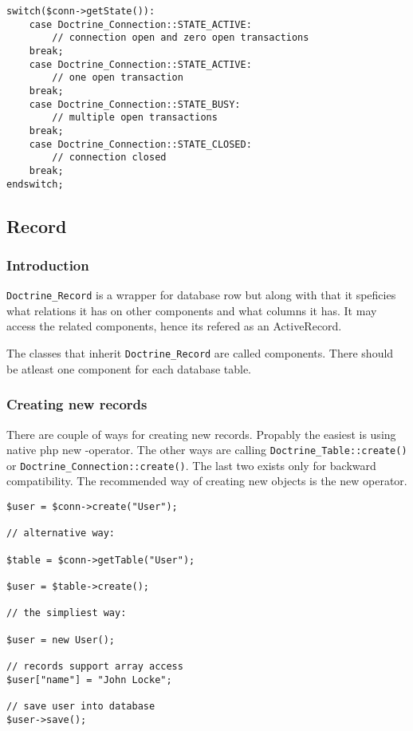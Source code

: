 \documentclass[11pt,a4paper]{report}
\begin{document}
\begin{verbatim}
switch($conn->getState()):
    case Doctrine_Connection::STATE_ACTIVE:
        // connection open and zero open transactions
    break;
    case Doctrine_Connection::STATE_ACTIVE:
        // one open transaction
    break;
    case Doctrine_Connection::STATE_BUSY:
        // multiple open transactions
    break;
    case Doctrine_Connection::STATE_CLOSED:
        // connection closed
    break;
endswitch;
\end{verbatim}

\subsection{Record}
\subsubsection{Introduction}
\texttt{Doctrine\_Record} is a wrapper for database row but along with that it speficies what relations it has\newline
on other components and what columns it has. It may access the related components, hence its refered as an ActiveRecord.

The classes that inherit \texttt{Doctrine\_Record} are called components. There should be atleast one component for each database table.

\subsubsection{Creating new records}
There are couple of ways for creating new records. Propably the easiest is using native php new -operator. The other ways are calling \texttt{Doctrine\_Table::create()} or \texttt{Doctrine\_Connection::create()}. The last two exists only for backward compatibility. The recommended way of creating new objects is the new operator.

\begin{verbatim}
$user = $conn->create("User");

// alternative way:

$table = $conn->getTable("User");

$user = $table->create();

// the simpliest way:

$user = new User();

// records support array access
$user["name"] = "John Locke";

// save user into database
$user->save();
\end{verbatim}
\end{document}
